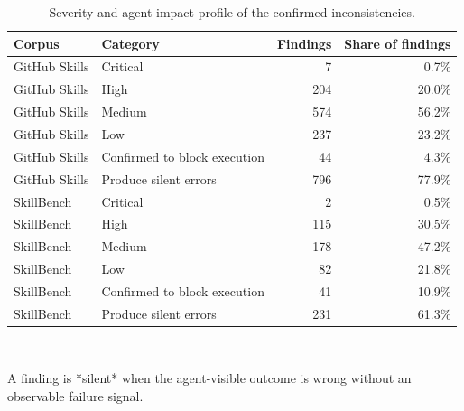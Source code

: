 \begin{table}[t]
  \centering
  \caption{Severity and agent-impact profile of the confirmed inconsistencies.}
  \label{tab:rq1-severity}
  \small
  \setlength{\tabcolsep}{4pt}

  \begin{tabular}{llrr}
    \toprule
    Corpus & Category & Findings & Share of findings \\
    \midrule
    GitHub Skills & Critical & 7 & 0.7\% \\
    GitHub Skills & High & 204 & 20.0\% \\
    GitHub Skills & Medium & 574 & 56.2\% \\
    GitHub Skills & Low & 237 & 23.2\% \\
    GitHub Skills & Confirmed to block execution & 44 & 4.3\% \\
    GitHub Skills & Produce silent errors & 796 & 77.9\% \\
    SkillBench & Critical & 2 & 0.5\% \\
    SkillBench & High & 115 & 30.5\% \\
    SkillBench & Medium & 178 & 47.2\% \\
    SkillBench & Low & 82 & 21.8\% \\
    SkillBench & Confirmed to block execution & 41 & 10.9\% \\
    SkillBench & Produce silent errors & 231 & 61.3\% \\
    \bottomrule
  \end{tabular}
  \\[2pt]
  \begin{minipage}{\linewidth}
    \footnotesize\raggedright A finding is *silent* when the agent-visible outcome is wrong without an observable failure signal.
  \end{minipage}
\end{table}
